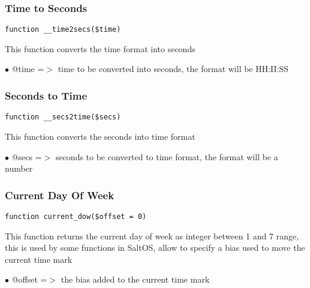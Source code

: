 \documentclass[a4paper]{article}
\begin{document}
\hypertarget{toc106}{}
\subsubsection{Time to Seconds}

\begin{lstlisting}
function __time2secs($time)
\end{lstlisting}

This function converts the time format into seconds

\begin{compactitem}
\item[\color{myblue}$\bullet$] @time =$>$ time to be converted into seconds, the format will be HH:II:SS
\end{compactitem}

\hypertarget{toc107}{}
\subsubsection{Seconds to Time}

\begin{lstlisting}
function __secs2time($secs)
\end{lstlisting}

This function converts the seconds into time format

\begin{compactitem}
\item[\color{myblue}$\bullet$] @secs =$>$ seconds to be converted to time format, the format will be a number
\end{compactitem}

\hypertarget{toc108}{}
\subsubsection{Current Day Of Week}

\begin{lstlisting}
function current_dow($offset = 0)
\end{lstlisting}

This function returns the current day of week as integer between 1 and 7
range, this is used by some functions in SaltOS, allow to specify a bias
used to move the current time mark

\begin{compactitem}
\item[\color{myblue}$\bullet$] @offset =$>$ the bias added to the current time mark
\end{compactitem}
\end{document}
